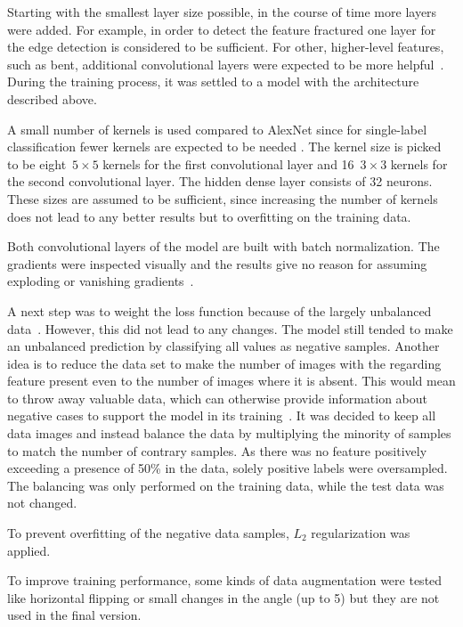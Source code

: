 Starting with the smallest layer size possible, in the course of time more layers were added. For example, in order to detect the feature fractured one layer for the edge detection is considered to be sufficient. For other, higher-level features, such as bent, additional convolutional layers were expected to be more helpful~\citep{geron2019hands}. During the training process, it was settled to a model with the architecture described above.
 
A small number of kernels is used compared to AlexNet since for single-label classification fewer kernels are expected to be needed \citep{geron2019hands}. The kernel size is picked to be eight~$5\times5$ kernels for the first convolutional layer and 16~$3\times3$ kernels for the second convolutional layer. The hidden dense layer consists of 32 neurons. These sizes are assumed to be sufficient, since increasing the number of kernels does not lead to any better results but to overfitting on the training data.
 
Both convolutional layers of the model are built with batch normalization. The gradients were inspected visually and the results give no reason for assuming exploding or vanishing gradients~\citep{pascanu2012understanding}.
 
A next step was to weight the loss function because of the largely unbalanced data~\citep{he2009learning,batista2004study}. However, this did not lead to any changes. The model still tended to make an unbalanced prediction by classifying all values as negative samples. Another idea is to reduce the data set to make the number of images with the regarding feature present even to the number of images where it is absent. This would mean to throw away valuable data, which can otherwise provide information about negative cases to support the model in its training~\citep{batista2004study}. It was decided to keep all data images and instead balance the data by multiplying the minority of samples to match the number of contrary samples. As there was no feature positively exceeding a presence of 50\% in the data, solely positive labels were oversampled. The balancing was only performed on the training data, while the test data was not changed.
 
To prevent overfitting of the negative data samples, \(L_2\) regularization was applied.
 
To improve training performance, some kinds of data augmentation were tested \citep{brownlee2019augmentation} like horizontal flipping or small changes in the angle (up to 5\textdegree ) but they are not used in the final version.

